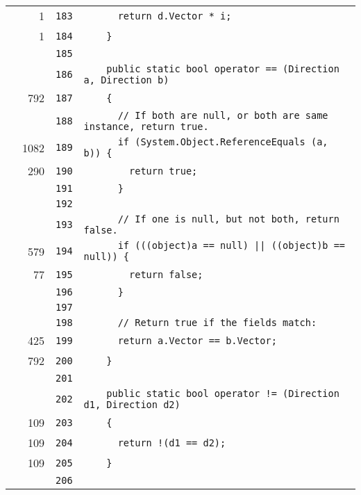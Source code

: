 \documentclass[a4paper,10pt]{article}
\begin{document}
\begin{longtable}[l]{lrrl}
\cellcolor{green} & 1 & \verb~183~ & \verb~      return d.Vector * i;~\\
\cellcolor{green} & 1 & \verb~184~ & \verb~    }~\\
\cellcolor{gray} &  & \verb~185~ & \verb~~\\
\cellcolor{gray} &  & \verb~186~ & \verb~    public static bool operator == (Direction a, Direction b)~\\
\cellcolor{green} & 792 & \verb~187~ & \verb~    {~\\
\cellcolor{gray} &  & \verb~188~ & \verb~      // If both are null, or both are same instance, return true.~\\
\cellcolor{green} & 1082 & \verb~189~ & \verb~      if (System.Object.ReferenceEquals (a, b)) {~\\
\cellcolor{green} & 290 & \verb~190~ & \verb~        return true;~\\
\cellcolor{gray} &  & \verb~191~ & \verb~      }~\\
\cellcolor{gray} &  & \verb~192~ & \verb~~\\
\cellcolor{gray} &  & \verb~193~ & \verb~      // If one is null, but not both, return false.~\\
\cellcolor{green} & 579 & \verb~194~ & \verb~      if (((object)a == null) || ((object)b == null)) {~\\
\cellcolor{green} & 77 & \verb~195~ & \verb~        return false;~\\
\cellcolor{gray} &  & \verb~196~ & \verb~      }~\\
\cellcolor{gray} &  & \verb~197~ & \verb~~\\
\cellcolor{gray} &  & \verb~198~ & \verb~      // Return true if the fields match:~\\
\cellcolor{green} & 425 & \verb~199~ & \verb~      return a.Vector == b.Vector;~\\
\cellcolor{green} & 792 & \verb~200~ & \verb~    }~\\
\cellcolor{gray} &  & \verb~201~ & \verb~~\\
\cellcolor{gray} &  & \verb~202~ & \verb~    public static bool operator != (Direction d1, Direction d2)~\\
\cellcolor{green} & 109 & \verb~203~ & \verb~    {~\\
\cellcolor{green} & 109 & \verb~204~ & \verb~      return !(d1 == d2);~\\
\cellcolor{green} & 109 & \verb~205~ & \verb~    }~\\
\cellcolor{gray} &  & \verb~206~ & \verb~~\\

\end{longtable}
\end{document}
